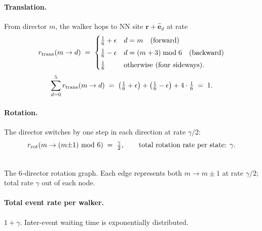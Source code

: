 \documentclass[11pt,a4paper]{article}
\newcommand{\vr}{\mathbf{r}}
\newcommand{\veps}[1]{\hat{\mathbf{e}}_{#1}}
\begin{document}
\paragraph{Translation.} From director $m$, the walker hops to NN site
$\vr + \veps{d}$ at rate
\begin{equation}\label{eq:trans_rates}
r_{\rm trans}(m \to d) \;=\;
\begin{cases}
\tfrac{1}{6} + \epsilon & d = m \quad \text{(forward)} \\[1mm]
\tfrac{1}{6} - \epsilon & d = (m+3) \bmod 6 \quad \text{(backward)} \\[1mm]
\tfrac{1}{6} & \text{otherwise (four sideways).}
\end{cases}
\end{equation}
\begin{equation}\label{eq:trans_total}
\sum_{d=0}^{5} r_{\rm trans}(m \to d) \;=\; \big(\tfrac{1}{6}+\epsilon\big) + \big(\tfrac{1}{6}-\epsilon\big) + 4 \cdot \tfrac{1}{6} \;=\; 1.
\end{equation}

\paragraph{Rotation.} The director switches by one step in each direction at rate $\gamma/2$:
\begin{equation}\label{eq:rot_rates}
r_{\rm rot}(m \to (m{\pm}1) \!\!\mod 6) \;=\; \tfrac{\gamma}{2},
\qquad \text{total rotation rate per state: } \gamma.
\end{equation}

\begin{center}
\\[2mm]
{\footnotesize The 6-director rotation graph. Each edge represents both
$m \to m \pm 1$ at rate $\gamma/2$; total rate $\gamma$ out of each
node.}
\end{center}

\paragraph{Total event rate per walker.} $1 + \gamma$. Inter-event waiting time is exponentially distributed.
\end{document}
